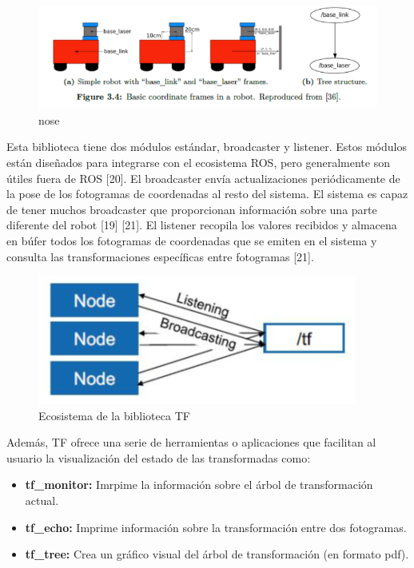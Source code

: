         \begin{figure}[htb]
            \centering
            \includegraphics[width=0.8\linewidth]{Main/Chapter3/Images3/3-6/estructura-arbol-tf.png}
            \caption{nose}
            \label{f:Cap3-6_nose1}
        \end{figure}    
        
        Esta biblioteca tiene dos módulos estándar, broadcaster y listener. Estos módulos están diseñados para integrarse con el ecosistema ROS, pero generalmente son útiles fuera de ROS [20]. El broadcaster envía actualizaciones periódicamente de la pose de los fotogramas de coordenadas al resto del sistema. El sistema es capaz de tener muchos broadcaster que proporcionan información sobre una parte diferente del robot [19] [21]. El listener recopila los valores recibidos y almacena en búfer todos los fotogramas de coordenadas que se emiten en el sistema y consulta las transformaciones específicas entre fotogramas [21].

        \begin{figure}[htb]
            \centering
            \includegraphics[width=0.8\linewidth]{Main/Chapter3/Images3/3-6/esquema-funcionamiento-tf.png}
            \caption{Ecosistema de la biblioteca TF}
            \label{f:Cap3-6_ecosistema_tf}
        \end{figure}   
        
        Además, TF ofrece una serie de herramientas o aplicaciones que facilitan al usuario la visualización del estado de las transformadas como:
        
        \begin{itemize}
            \item \textbf{tf\_monitor:} Imrpime la información sobre el árbol de transformación actual.
            \item \textbf{tf\_echo:} Imprime información sobre la transformación entre dos fotogramas.
            \item \textbf{tf\_tree:} Crea un gráfico visual del árbol de transformación (en formato pdf).
        \end{itemize}
        
